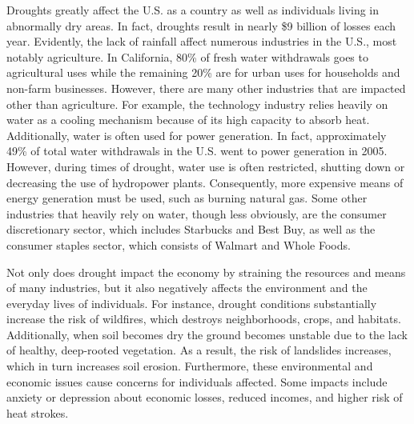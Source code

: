 \documentclass{article}
\begin{document}
Droughts greatly affect the U.S. as a country as well as individuals living in abnormally dry areas. In fact, droughts result in nearly \$9 billion of losses each year.\cite{NOAA:2019} Evidently, the lack of rainfall affect numerous industries in the U.S., most notably agriculture. In California, 80\% of fresh water withdrawals goes to agricultural uses while the remaining 20\% are for urban uses for households and non-farm businesses.\cite{Kearney:2014} However, there are many other industries that are impacted other than agriculture. For example, the technology industry relies heavily on water as a cooling mechanism because of its high capacity to absorb heat. Additionally, water is often used for power generation. In fact, approximately 49\% of total water withdrawals in the U.S. went to power generation in 2005.\cite{Kearney:2014} However, during times of drought, water use is often restricted, shutting down or decreasing the use of hydropower plants. Consequently, more expensive means of energy generation must be used, such as burning natural gas.\cite{NCSU:2019} Some other industries that heavily rely on water, though less obviously, are the consumer discretionary sector, which includes Starbucks and Best Buy, as well as the consumer staples sector, which consists of Walmart and Whole Foods.\cite{Kearney:2014}

Not only does drought impact the economy by straining the resources and means of many industries, but it also negatively affects the environment and the everyday lives of individuals. For instance, drought conditions substantially increase the risk of wildfires, which destroys neighborhoods, crops, and habitats. Additionally, when soil becomes dry the ground becomes unstable due to the lack of healthy, deep-rooted vegetation. As a result, the risk of landslides increases, which in turn increases soil erosion.\cite{NCSU:2019} Furthermore, these environmental and economic issues cause concerns for individuals affected. Some impacts include anxiety or depression about economic losses, reduced incomes, and higher risk of heat strokes.\cite{NOAA:2019}
\end{document}
